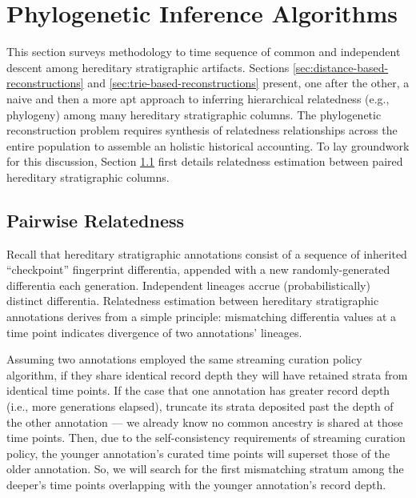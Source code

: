 \section{Phylogenetic Inference Algorithms} \label{sec:reconstruction}

This section surveys methodology to time sequence of common and independent descent among hereditary stratigraphic artifacts.
Sections \ref{sec:distance-based-reconstructions} and \ref{sec:trie-based-reconstructions} present, one after the other, a naive and then a more apt approach to inferring hierarchical relatedness (e.g., phylogeny) among many hereditary stratigraphic columns.
The phylogenetic reconstruction problem requires synthesis of relatedness relationships across the entire population to assemble an holistic historical accounting.
To lay groundwork for this discussion, Section \ref{sec:pairwise-relatedness} first details relatedness estimation between paired hereditary stratigraphic columns.

\subsection{Pairwise Relatedness}
\label{sec:pairwise-relatedness}

Recall that hereditary stratigraphic annotations consist of a sequence of inherited ``checkpoint'' fingerprint differentia, appended with a new randomly-generated differentia each generation.
Independent lineages accrue (probabilistically) distinct differentia.
Relatedness estimation between hereditary stratigraphic annotations derives from a simple principle: mismatching differentia values at a time point indicates divergence of two annotations' lineages.

Assuming two annotations employed the same streaming curation policy algorithm, if they share identical record depth they will have retained strata from identical time points.
If the case that one annotation has greater record depth (i.e., more generations elapsed), truncate its strata deposited past the depth of the other annotation --- we already know no common ancestry is shared at those time points.
Then, due to the self-consistency requirements of streaming curation policy, the younger annotation's curated time points will superset those of the older annotation.
So, we will search for the first mismatching stratum among the deeper's time points overlapping with the younger annotation's record depth.

